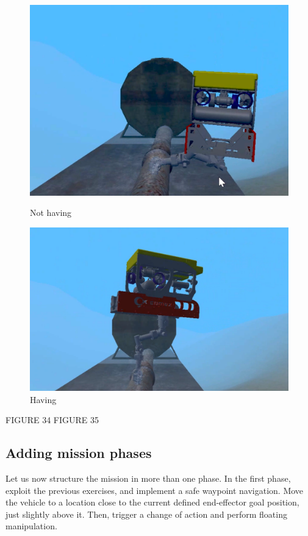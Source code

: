 \documentclass{article}
\begin{document}
\begin{figure}[htp]
    \centering
    \begin{minipage}{0.50\textwidth}
    \includegraphics[scale=0.37]{513_comment.png}
    \caption{Not having}
    \end{minipage}
\hfill
    \centering
    \begin{minipage}{0.50\textwidth}
    \includegraphics[scale=0.3]{513_uncomment.png}
    \caption{Having}
    \end{minipage}
\end{figure}

FIGURE 34 
FIGURE 35

\clearpage

\subsection{Adding mission phases}
Let us now structure the mission in more than one phase. In the first phase, exploit the previous exercises, and implement a safe waypoint navigation. Move the vehicle to a location close to the current defined end-effector goal position, just slightly above it. Then, trigger a change of action and perform floating manipulation.
\end{document}
